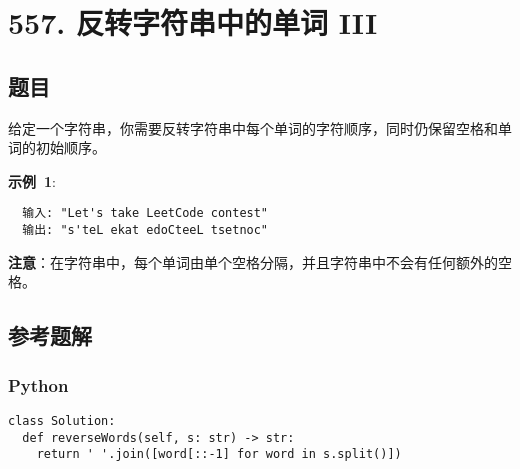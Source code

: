 \newpage
\section{557. 反转字符串中的单词 III}
\label{leetcode:557}

\subsection{题目}

给定一个字符串，你需要反转字符串中每个单词的字符顺序，同时仍保留空格和单词的初始顺序。

\textbf{示例 1}:

\begin{verbatim}
  输入: "Let's take LeetCode contest"
  输出: "s'teL ekat edoCteeL tsetnoc" 
\end{verbatim}

\textbf{注意}：在字符串中，每个单词由单个空格分隔，并且字符串中不会有任何额外的空格。

\subsection{参考题解}

\subsubsection{Python}

\begin{verbatim}
class Solution:
  def reverseWords(self, s: str) -> str:
    return ' '.join([word[::-1] for word in s.split()])
\end{verbatim}
